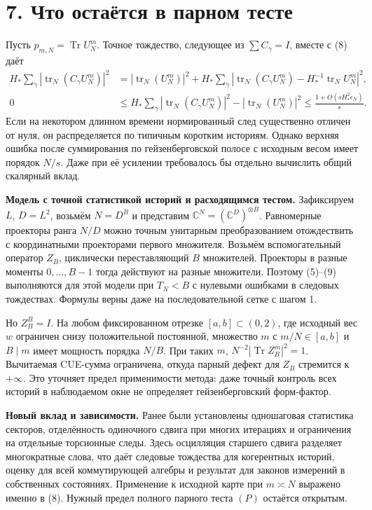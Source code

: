 \documentclass[11pt,a4paper]{article}
\newcommand{\Tr}{\operatorname{Tr}}
\newcommand{\trn}{\operatorname{tr}_N}
\newcommand{\C}{\mathbb C}
\newcommand{\sect}[1]{\section*{\sffamily\color{ink}#1}}
\newcommand{\subt}[1]{\par\medskip\noindent\textbf{#1.}\quad}
\begin{document}
\newpage
\sect{7. Что остаётся в парном тесте}
Пусть \(p_{m,N}=\Tr U_N^m\). Точное тождество, следующее из \(\sum C_\gamma=I\), вместе с (8) даёт
\begin{align*}
 H_*\sum_\gamma|\trn(C_\gamma U_N^m)|^2
    &=|\trn(U_N^m)|^2+
       H_*\sum_\gamma\left|\trn(C_\gamma U_N^m)
                     -H_*^{-1}\trn U_N^m\right|^2,\\
 0&\le H_*\sum_\gamma|\trn(C_\gamma U_N^m)|^2
                      -|\trn(U_N^m)|^2
       \le \frac{1+O(sH_*^2\epsilon_N)}{s}.
\end{align*}
Если на некотором длинном времени нормированный след существенно отличен от нуля, он распределяется по типичным коротким историям. Однако верхняя ошибка после суммирования по гейзенберговской полосе с исходным весом имеет порядок \(N/s\). Даже при её усилении требовалось бы отдельно вычислить общий скалярный вклад.

\subt{Модель с точной статистикой историй и расходящимся тестом}
Зафиксируем \(L\), \(D=L^2\), возьмём \(N=D^B\) и представим
\(\C^N=(\C^D)^{\otimes B}\). Равномерные проекторы ранга \(N/D\) можно точным унитарным преобразованием отождествить с координатными проекторами первого множителя. Возьмём вспомогательный оператор \(Z_B\), циклически переставляющий \(B\) множителей. Проекторы в разные моменты \(0,\ldots,B-1\) тогда действуют на разные множители. Поэтому (5)--(9) выполняются для этой модели при \(T_N<B\) с нулевыми ошибками в следовых тождествах. Формулы верны даже на последовательной сетке с шагом 1.

Но \(Z_B^B=I\). На любом фиксированном отрезке \([a,b]\subset(0,2)\), где исходный вес \(w\) ограничен снизу положительной постоянной, множество \(m\) с \(m/N\in[a,b]\) и \(B\mid m\) имеет мощность порядка \(N/B\). При таких \(m\), \(N^{-2}|\Tr Z_B^m|^2=1\). Вычитаемая CUE-сумма ограничена, откуда парный дефект для \(Z_B\) стремится к \(+\infty\). Это уточняет предел применимости метода: даже точный контроль всех историй в наблюдаемом окне не определяет гейзенберговский форм-фактор.

\subt{Новый вклад и зависимости}
Ранее были установлены одношаговая статистика секторов, отделённость одиночного сдвига при многих итерациях и ограничения на отдельные торсионные следы. Здесь осцилляция старшего сдвига разделяет многократные слова, что даёт следовые тождества для когерентных историй, оценку для всей коммутирующей алгебры и результат для законов измерений в собственных состояниях. Применение к исходной карте при \(m\asymp N\) выражено именно в (8). Нужный предел полного парного теста \((P)\) остаётся открытым.
\end{document}
